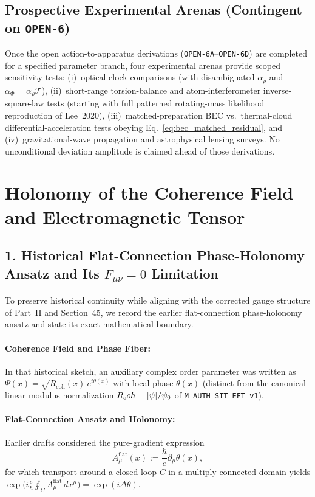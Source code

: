 \subsection{Prospective Experimental Arenas (Contingent on \texttt{OPEN-6})}

Once the open action-to-apparatus derivations (\texttt{OPEN-6A}--\texttt{OPEN-6D}) are completed for a specified parameter branch, four experimental arenas provide scoped sensitivity tests: (i)~optical-clock comparisons (with disambiguated $\alpha_\rho$ and $\alpha_\Phi = \alpha_\rho\mathcal{T}$), (ii)~short-range torsion-balance and atom-interferometer inverse-square-law tests (starting with full patterned rotating-mass likelihood reproduction of Lee~2020), (iii)~matched-preparation BEC vs.\ thermal-cloud differential-acceleration tests obeying Eq.~\eqref{eq:bec_matched_residual}, and (iv)~gravitational-wave propagation and astrophysical lensing surveys. No unconditional deviation amplitude is claimed ahead of those derivations.

\section{Holonomy of the Coherence Field and Electromagnetic Tensor}
\label{sec:HolonomyEM}

\subsection{1. Historical Flat-Connection Phase-Holonomy Ansatz and Its $F_{\mu\nu}=0$ Limitation}

To preserve historical continuity while aligning with the corrected gauge structure of Part~II and Section~45, we record the earlier flat-connection phase-holonomy ansatz and state its exact mathematical boundary.

\paragraph{Coherence Field and Phase Fiber:}
In that historical sketch, an auxiliary complex order parameter was written as $\Psi(x) = \sqrt{R_{\mathrm{coh}}(x)}\,e^{i\theta(x)}$ with local phase $\theta(x)$ (distinct from the canonical linear modulus normalization $R_coh = |\psi|/\psi_0$ of \texttt{M\_AUTH\_SIT\_EFT\_v1}).

\paragraph{Flat-Connection Ansatz and Holonomy:}
Earlier drafts considered the pure-gradient expression
\[
A_\mu^{\mathrm{flat}}(x) := \frac{\hbar}{e} \partial_\mu \theta(x),
\]
for which transport around a closed loop $C$ in a multiply connected domain yields $\exp\bigl(i\frac{e}{\hbar}\oint_C A_\mu^{\mathrm{flat}}\,dx^\mu\bigr) = \exp(i\Delta\theta)$.

